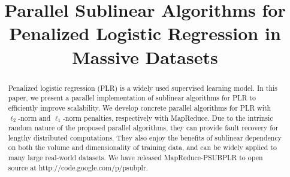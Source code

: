 \documentclass{llncs}
\begin{document}
\mainmatter  %

\title{Parallel Sublinear Algorithms for Penalized Logistic Regression in Massive Datasets}


%
%

%
\maketitle

\begin{abstract}
Penalized logistic regression (PLR) is a widely used supervised learning model.
In this paper, we present a parallel implementation of sublinear algorithms for PLR to efficiently improve scalability.
We develop concrete parallel algorithms for PLR with $\ell_2$-norm and $\ell_1$-norm penalties, respectively with MapReduce.
Due to the intrinsic random nature of the proposed parallel algorithms, they can provide fault recovery for lengthy distributed computations.
They also enjoy the benefits of sublinear dependency on both the volume and dimensionality of training data, and can be widely applied to many large real-world datasets.
We have released MapReduce-PSUBPLR to open source at http://code.google.com/p/psubplr.
\end{abstract}
\end{document}
